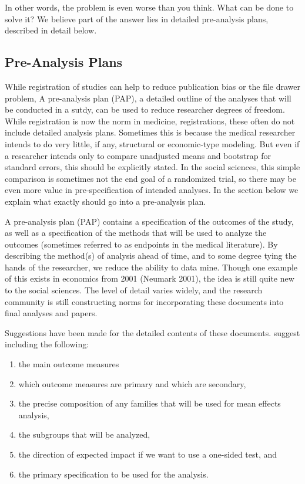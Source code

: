 \documentclass[12pt] {article}
\begin{document}
In other words, the problem is even worse than you think. What can be
done to solve it? We believe part of the answer lies in detailed
pre-analysis plans, described in detail below.

\subsection{Pre-Analysis
Plans}\label{pre-analysis-plans}

While registration of studies can help to reduce publication bias or the file drawer problem, 
A pre-analysis plan (PAP), a detailed outline of the analyses that will be conducted in a sutdy, can be used to reduce researcher degrees of freedom. While registration is now the norm in medicine,
registrations, these often do not include
detailed analysis plans. Sometimes
this is because the medical researcher intends to do very little, if
any, structural or economic-type modeling. But even if a researcher
intends only to compare unadjusted means and bootstrap for standard
errors, this should be explicitly stated. In the social sciences, this
simple comparison is sometimes not the end goal of a randomized trial,
so there may be even more value in pre-specification of intended analyses.
In the section below we explain what exactly should go into a pre-analysis plan.

A pre-analysis plan (PAP) contains a specification of the outcomes of the study, as well as a specification
of the methods that will be used to analyze the outcomes (sometimes
referred to as endpoints in the medical literature). By describing the
method(s) of analysis ahead of time, and to some degree tying the hands
of the researcher, we reduce the ability to data mine. Though one
example of this exists in economics from 2001 (Neumark 2001), the idea
is still quite new to the social sciences. The level of detail varies
widely, and the research community is still constructing norms for
incorporating these documents into final analyses and papers.

Suggestions have been made for the detailed contents of these documents.
\cite{glennerster_running_2013} suggest including the following:

\begin{enumerate}
\def\labelenumi{\arabic{enumi}.}
\item
  the main outcome measures
\item
  which outcome measures are primary and which are secondary,
\item
  the precise composition of any families that will be used for mean
  effects analysis,
\item
  the subgroups that will be analyzed,
\item
  the direction of expected impact if we want to use a one-sided test,
  and
\item
  the primary specification to be used for the analysis.
\end{enumerate}
\end{document}
